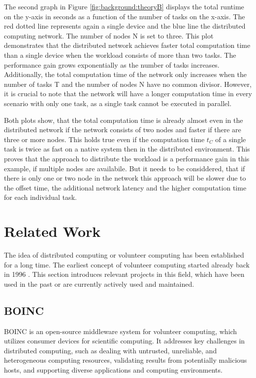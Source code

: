 The second graph in Figure \ref{fig:background:theoryB} displays the total runtime on the y-axis in seconds as a function of the number of tasks on the x-axis. The red dotted line represents again a single device and the blue line the distributed computing network. The number of nodes N is set to three. This plot demonstrates that the distributed network achieves faster total computation time than a single device when the workload consists of more than two tasks. The performance gain grows exponentially as the number of tasks increases. Additionally, the total computation time of the network only increases when the number of tasks T and the number of nodes N have no common divisor. However, it is crucial to note that the network will have a longer computation time in every scenario with only one task, as a single task cannot be executed in parallel.

Both plots show, that the total computation time is already almost even in the distributed network if the network consists of two nodes and faster if there are three or more nodes. This holds true even if the computation time $t_{C}$ of a single task is twice as fast on a native system then in the distributed environment. This proves that the approach to distribute the workload is a performance gain in this example, if multiple nodes are availabile. But it needs to be considdered, that if there is only one or two node in the network this approach will be slower due to the offset time, the additional network latency and the higher computation time for each individual task.


\section{Related Work}
\label{sec:background:related_work}
The idea of distributed computing or volunteer computing has been established for a long time. The earliest concept of volunteer computing started already back in 1996 \cite{relatedwork:boinc1}. This section introduces relevant projects in this field, which have been used in the past or are currently actively used and maintained.   
\subsection{BOINC}
\label{subsec:background:related_work:boinc}
\ac{BOINC} is an open-source middleware system for volunteer computing, which utilizes consumer devices for scientific computing. It addresses key challenges in distributed computing, such as dealing with untrusted, unreliable, and heterogeneous computing resources, validating results from potentially malicious hosts, and supporting diverse applications and computing environments. \cite{relatedwork:boinc1}

